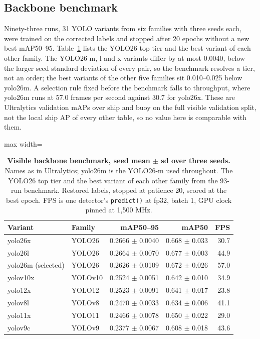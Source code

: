 \documentclass[10pt]{article}
\begin{document}
\subsection{Backbone benchmark}\label{sec:3.5}
Ninety-three runs, 31 YOLO variants from six families with three seeds each, were trained on the corrected labels and stopped after 20 epochs without a new best mAP50--95. Table~\ref{tab:1} lists the YOLO26 top tier and the best variant of each other family. The YOLO26 m, l and x variants differ by at most 0.0040, below the larger seed standard deviation of every pair, so the benchmark resolves a tier, not an order; the best variants of the other five families sit 0.010--0.025 below yolo26m. A selection rule fixed before the benchmark falls to throughput, where yolo26m runs at 57.0 frames per second against 30.7 for yolo26x. These are Ultralytics validation mAPs over ship and buoy on the full visible validation split, not the local ship AP of every other table, so no value here is comparable with them.

\begin{table}[htbp]
\centering
\small
\caption{\textbf{Visible backbone benchmark, seed mean $\pm$ sd over three seeds.} Names as in Ultralytics; yolo26m is the YOLO26-m used throughout. The YOLO26 top tier and the best variant of each other family from the 93-run benchmark. Restored labels, stopped at patience 20, scored at the best epoch. FPS is one detector's \texttt{predict()} at fp32, batch 1, GPU clock pinned at 1,500 MHz.}
\label{tab:1}
\begin{adjustbox}{max width=\linewidth}
\begin{tabular}{llrrr}
\toprule
Variant & Family & mAP50--95 & mAP50 & FPS \\
\midrule
yolo26x & YOLO26 & 0.2666 $\pm$ 0.0040 & 0.668 $\pm$ 0.033 & 30.7 \\
yolo26l & YOLO26 & 0.2664 $\pm$ 0.0070 & 0.677 $\pm$ 0.003 & 44.9 \\
yolo26m (selected) & YOLO26 & 0.2626 $\pm$ 0.0109 & 0.672 $\pm$ 0.026 & 57.0 \\
yolov10x & YOLOv10 & 0.2524 $\pm$ 0.0051 & 0.642 $\pm$ 0.010 & 34.9 \\
yolo12x & YOLO12 & 0.2523 $\pm$ 0.0091 & 0.641 $\pm$ 0.017 & 23.8 \\
yolov8l & YOLOv8 & 0.2470 $\pm$ 0.0033 & 0.634 $\pm$ 0.006 & 41.1 \\
yolo11x & YOLO11 & 0.2466 $\pm$ 0.0078 & 0.650 $\pm$ 0.022 & 29.0 \\
yolov9c & YOLOv9 & 0.2377 $\pm$ 0.0067 & 0.608 $\pm$ 0.018 & 43.6 \\
\bottomrule
\end{tabular}
\end{adjustbox}
\end{table}
\end{document}
